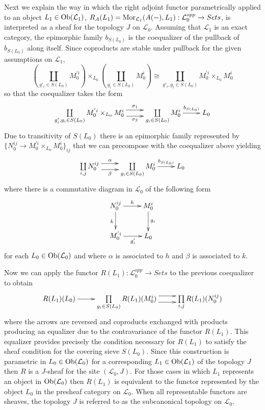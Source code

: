 \documentclass[aps,twocolumn]{revtex4-1}
\begin{document}
Next we explain the way in which the right adjoint functor parametrically applied to an object $L_1 \in \mathop{\rm Ob}\nolimits(\mathcal{L}_1)$, $R_A(L_1) = \mathop{\rm Mor}\nolimits_{\mathcal{L}_1}(A(-),L_1): \mathcal{L}_0^{opp} \rightarrow Sets$, is interpreted as a sheaf for the topology $J$ on $\mathcal{L}_0$. Assuming that $\mathcal{L}_1$ is an exact category, the epimorphic family $b_{S(L_0)}$ is the coequalizer of the pullback of $b_{S(L_0)}$ along itself. Since coproducts are stable under pullback for the given assumptions on $\mathcal{L}_1$,
$$
\left( \coprod\limits_{g'_i \in S(L_0)} M_{0}^{'i} \right) \times_{L_0} \left( \coprod\limits_{g_i \in S(L_0)} M_0^i \right) \cong \coprod\limits_{g'_i , g_i \in S(L_0)} M_0^{'i} \times_{L_0} M_0^i
$$
so that the coequalizer takes the form
\begin{displaymath}
\xymatrix{
\coprod\limits_{g'_i , g_i \in S(L_0)} M_0^{'i} \times_{L_0} M_0^i
\ar@<1ex>[r]^-{\sigma_1} \ar@<-1ex>[r]_-{\sigma_2}
&
\coprod\limits_{g_i \in S(L_0)} M_0^i
\ar[r]^-{b_{S(L_0)}}
&
L_0
}
\end{displaymath}
Due to transitivity of $S(L_0)$ there is an epimorphic family represented by $\{ N_0^{ij} \rightarrow M_0^{'i} \times_{L_0} M_0^i \}_{ij}$ that we can precompose with the coequalizer above yielding
\begin{displaymath}
\xymatrix{
\coprod\limits_{i,j} N_0^{ij}
\ar@<1ex>[r]^-{\alpha} \ar@<-1ex>[r]_-{\beta}
&
\coprod\limits_{g_i \in S(L_0)} M_0^i
\ar[r]^-{b_{S(L_0)}}
&
L_0
}
\end{displaymath}
where there is a commutative diagram in $\mathcal{L}_0$ of the following form
\begin{displaymath}
\xymatrix{
N_0^{ij} \ar[r]^-{h} \ar[d]_{k} & M_0^i \ar[d]^{g_i} \\
M_0^{'i} \ar[r]_-{g'_i} & L_0
}
\end{displaymath}
for each $L_0 \in \mathop{\rm Ob}\nolimits(\mathcal{L}_0)$ and where $\alpha$ is associated to $h$ and $\beta$ is associated to $k$.

Now we can apply the functor $R(L_1): \mathcal{L}_0^{opp} \rightarrow Sets$ to the previous coequalizer to obtain
\begin{displaymath}
\xymatrix{
R(L_1)(L_0) \ar[r]
&
\prod\limits_{g_i \in S(L_0)} R(L_1)(M_0^i)
\ar@<1ex>[r]^-{} \ar@<-1ex>[r]_-{}
&
\prod\limits_{i,j} R(L_1)(N_0^{ij})
}
\end{displaymath}
where the arrows are reversed and coproducts exchanged with products producing an equalizer due to the contravariance of the functor $R(L_1)$. This equalizer provides precisely the condition necessary for $R(L_1)$ to satisfy the sheaf condition for the covering sieve $S(L_0)$. Since this construction is parametric in $L_0 \in \mathop{\rm Ob}\nolimits(\mathcal{L}_0)$ for a corresponding $L_1 \in \mathop{\rm Ob}\nolimits(\mathcal{L}_1)$ of the topology $J$ then $R$ is a $J$-sheaf for the site $(\mathcal{L}_0,J)$. For those cases in which $L_1$ represents an object in $\mathop{\rm Ob}\nolimits(\mathcal{L}_0)$ then $R(L_1)$ is equivalent to the functor represented by the object $L_0$ in the presheaf category on $\mathcal{L}_0$. When all representable functors are sheaves, the topology $J$ is referred to as the subcanonical topology on $\mathcal{L}_0$.
\end{document}
